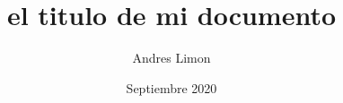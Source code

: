 \documentclass[one side, 12pt, two column, a3paper]{book}
\title{el titulo de mi documento}
\author{Andres Limon}
\date {Septiembre 2020}
\begin{document}
	\lipsum
\end{document}
